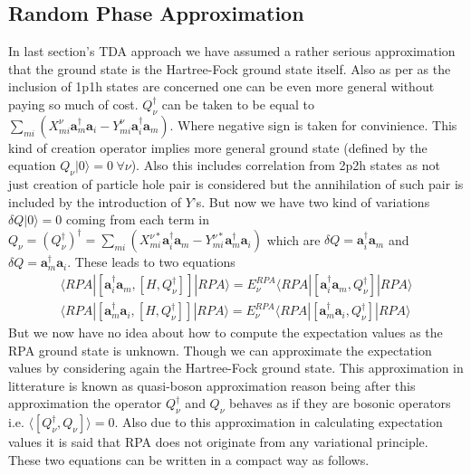 \documentclass[a4paper]{paper}
\begin{document}
        \subsection{Random Phase Approximation}
            In last section's TDA approach we have assumed a rather serious approximation that the ground state is the Hartree-Fock ground state itself. Also as per as the inclusion of 1p1h states are concerned one can be even more general without paying so much of cost. $Q^{\dagger}_{\nu}$ can be taken to be equal to $\sum_{m i} \left( X^{\nu}_{m i}\mathbf{a}^{\dagger}_{m}\mathbf{a}_i - Y^{\nu}_{m i}\mathbf{a}^{\dagger}_{i}\mathbf{a}_m \right)$. Where negative sign is taken for convinience. This kind of creation operator implies more general ground state (defined by the equation $Q_{\nu} |0\rangle = 0\hspace{3pt}\forall \nu $). Also this includes correlation from 2p2h states as not just creation of particle hole pair is considered but the annihilation of such pair is included by the introduction of $Y$'s. But now we have two kind of variations $\delta Q|0\rangle = 0$ coming from each term in $Q_{\nu} = (Q_{\nu}^{\dagger})^{\dagger} = \sum_{m i} \left( X^{\nu *}_{m i}\mathbf{a}^{\dagger}_{i}\mathbf{a}_m - Y^{\nu *}_{m i}\mathbf{a}^{\dagger}_{m}\mathbf{a}_i \right)$ which are $\delta Q = \mathbf{a}^{\dagger}_{i}\mathbf{a}_m $ and $\delta Q = \mathbf{a}^{\dagger}_{m}\mathbf{a}_i$. These leads to two equations
            \begin{eqnarray}
                \langle RPA|\left[ \mathbf{a}^{\dagger}_{i} \mathbf{a}_{m} ,\left[ H,Q_{\nu}^{\dagger} \right] \right]| RPA \rangle = E_{\nu}^{RPA}\langle RPA|\left[\mathbf{a}^{\dagger}_{i}\mathbf{a}_{m} ,Q_{\nu}^{\dagger}\right]| RPA \rangle \\
                \langle RPA|\left[ \mathbf{a}^{\dagger}_{m} \mathbf{a}_{i} ,\left[ H,Q_{\nu}^{\dagger} \right] \right]| RPA \rangle = E_{\nu}^{RPA}\langle RPA|\left[\mathbf{a}^{\dagger}_{m}\mathbf{a}_{i} ,Q_{\nu}^{\dagger}\right]| RPA \rangle
            \end{eqnarray}
            But we now have no idea about how to compute the expectation values as the RPA ground state is unknown. Though we can approximate the expectation values by considering again the Hartree-Fock ground state. This approximation in litterature is known as quasi-boson approximation reason being after this approximation the operator $ Q^{\dagger}_{\nu}$ and $Q_{\nu}$ behaves as if they are bosonic operators i.e. $\langle [ Q^{\dagger}_{\nu},Q_{\nu}] \rangle = 0$. Also due to this approximation in calculating expectation values it is said that RPA does not originate from any variational principle. These two equations can be written in a compact way as follows.
\end{document}
